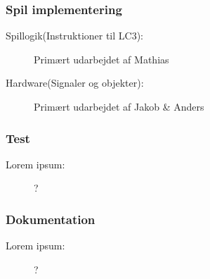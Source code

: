 \subsubsection*{Spil implementering}
\begin{description}
	\item[Spillogik(Instruktioner til LC3):] Primært udarbejdet af Mathias
	\item[Hardware(Signaler og objekter):] Primært udarbejdet af Jakob \& Anders
\end{description}

\subsubsection*{Test}
\begin{description}
	\item[Lorem ipsum:] ?
\end{description}

\subsubsection*{Dokumentation}
\begin{description}
	\item[Lorem ipsum:] ?
\end{description}